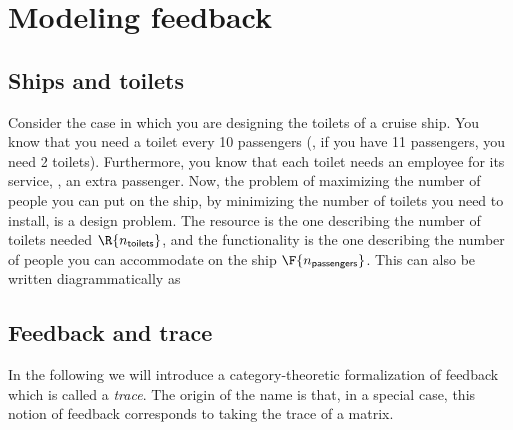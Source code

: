 
\section{Modeling feedback}
\label{sec:modeling-feedback}



\subsection{Ships and toilets}

Consider the case in which you are designing the toilets of a cruise ship.
You know that you need a toilet every 10 passengers (\ie, if you have 11 passengers, you need 2 toilets).
Furthermore, you know that each toilet needs an employee for its service, \ie, an extra passenger.
Now, the problem of maximizing the number of people you can put on the ship, by minimizing the number of toilets you need to install, is a design problem.
The resource  is the one describing the number of toilets needed $\R{n_\mathsf{toilets}}$, and the functionality  is the one describing the number of people you can accommodate on the ship $\F{n_\mathsf{passengers}}$.
This can also be written diagrammatically as



\subsection{Feedback and trace}

In the following we will introduce a category-theoretic formalization of feedback which is called a \emph{trace}. The origin of the name is that, in a special case, this notion of feedback corresponds to taking the trace of a matrix. 


